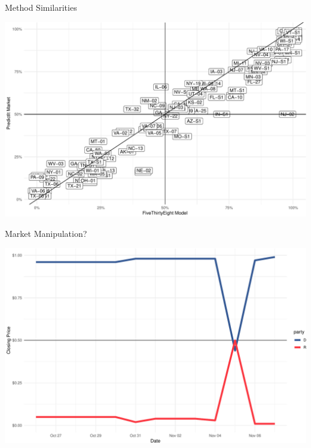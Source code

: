 \documentclass[ignorenonframetext,]{beamer}
\begin{document}
\begin{frame}{Method Similarities}
\protect\hypertarget{method-similarities}{}

\includegraphics{presentation_files/figure-beamer/plot_cartesian_races-1.pdf}

\end{frame}

\begin{frame}{Market Manipulation?}
\protect\hypertarget{market-manipulation}{}

\includegraphics{presentation_files/figure-beamer/plot_nj_02-1.pdf}

\end{frame}
\end{document}
